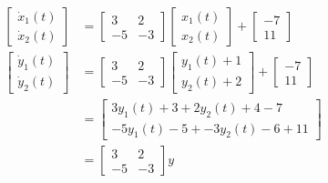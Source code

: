 \documentclass[12pt]{article}
\begin{document}
	\begin{align*}
		\begin{bmatrix}
			\dot{x}_1(t) \\
			\dot{x}_2(t)
		\end{bmatrix}
		&= 
		\begin{bmatrix}
			3 & 2 \\
			-5 & -3
		\end{bmatrix}
		\begin{bmatrix}
			x_1(t) \\
			x_2(t)
		\end{bmatrix} +
		\begin{bmatrix}
			-7 \\ 11
		\end{bmatrix} \\
		\begin{bmatrix}
		\dot{y}_1(t) \\
		\dot{y}_2(t)
		\end{bmatrix}
		&= 
		\begin{bmatrix}
		3 & 2 \\
		-5 & -3
		\end{bmatrix}
		\begin{bmatrix}
		y_1(t) + 1 \\
		y_2(t) + 2
		\end{bmatrix} +
		\begin{bmatrix}
		-7 \\ 11
		\end{bmatrix} \\
		&= \begin{bmatrix}
			3y_1(t) +3 + 2y_2(t) + 4 - 7  \\
			-5y_1(t) - 5 + -3y_2(t) - 6 + 11
		\end{bmatrix} \\
		&= \begin{bmatrix}
			3 & 2 \\
			-5 & -3
		\end{bmatrix}y
	\end{align*}
\newpage 
\end{document}
